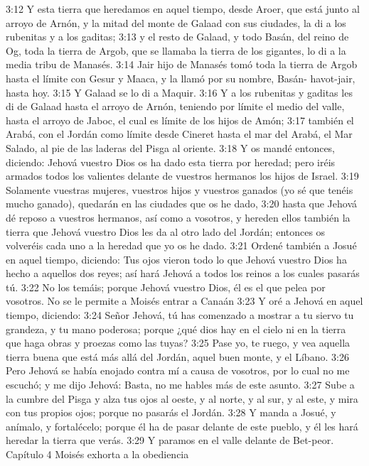 3:12 Y esta tierra que heredamos en aquel tiempo, desde Aroer, que está junto al arroyo de Arnón, y la mitad del monte de Galaad con sus ciudades, la di a los rubenitas y a los gaditas;  
3:13 y el resto de Galaad, y todo Basán, del reino de Og, toda la tierra de Argob, que se llamaba la tierra de los gigantes, lo di a la media tribu de Manasés.  
3:14 Jair hijo de Manasés tomó toda la tierra de Argob hasta el límite con Gesur y Maaca, y la llamó por su nombre, Basán- havot-jair, hasta hoy.  
3:15 Y Galaad se lo di a Maquir.  
3:16 Y a los rubenitas y gaditas les di de Galaad hasta el arroyo de Arnón, teniendo por límite el medio del valle, hasta el arroyo de Jaboc, el cual es límite de los hijos de Amón;  
3:17 también el Arabá, con el Jordán como límite desde Cineret hasta el mar del Arabá, el Mar Salado, al pie de las laderas del Pisga al oriente.  
3:18 Y os mandé entonces, diciendo: Jehová vuestro Dios os ha dado esta tierra por heredad; pero iréis armados todos los valientes delante de vuestros hermanos los hijos de Israel.  
3:19 Solamente vuestras mujeres, vuestros hijos y vuestros ganados (yo sé que tenéis mucho ganado), quedarán en las ciudades que os he dado,  
3:20 hasta que Jehová dé reposo a vuestros hermanos, así como a vosotros, y hereden ellos también la tierra que Jehová vuestro Dios les da al otro lado del Jordán; entonces os volveréis cada uno a la heredad que yo os he dado.  
3:21 Ordené también a Josué en aquel tiempo, diciendo: Tus ojos vieron todo lo que Jehová vuestro Dios ha hecho a aquellos dos reyes; así hará Jehová a todos los reinos a los cuales pasarás tú.  
3:22 No los temáis; porque Jehová vuestro Dios, él es el que pelea por vosotros.  
No se le permite a Moisés entrar a Canaán  
3:23 Y oré a Jehová en aquel tiempo, diciendo:  
3:24 Señor Jehová, tú has comenzado a mostrar a tu siervo tu grandeza, y tu mano poderosa; porque ¿qué dios hay en el cielo ni en la tierra que haga obras y proezas como las tuyas?  
3:25 Pase yo, te ruego, y vea aquella tierra buena que está más allá del Jordán, aquel buen monte, y el Líbano.  
3:26 Pero Jehová se había enojado contra mí a causa de vosotros, por lo cual no me escuchó; y me dijo Jehová: Basta, no me hables más de este asunto.  
3:27 Sube a la cumbre del Pisga y alza tus ojos al oeste, y al norte, y al sur, y al este, y mira con tus propios ojos; porque no pasarás el Jordán.  
3:28 Y manda a Josué, y anímalo, y fortalécelo; porque él ha de pasar delante de este pueblo, y él les hará heredar la tierra que verás.  
3:29 Y paramos en el valle delante de Bet-peor.  
Capítulo 4 
Moisés exhorta a la obediencia  

